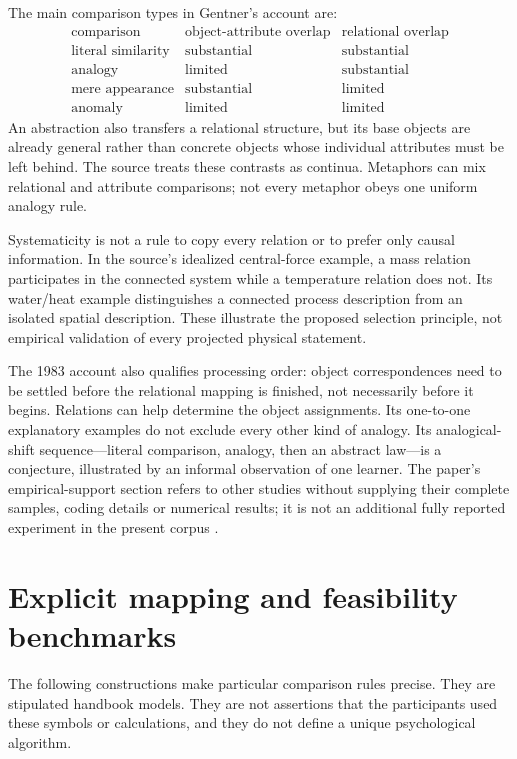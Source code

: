 The main comparison types in Gentner's account are:
\[
\begin{array}{l|cc}
 \text{comparison}&\text{object-attribute overlap}&
                   \text{relational overlap}\\ \hline
 \text{literal similarity}&\text{substantial}&\text{substantial}\\
 \text{analogy}&\text{limited}&\text{substantial}\\
 \text{mere appearance}&\text{substantial}&\text{limited}\\
 \text{anomaly}&\text{limited}&\text{limited}
\end{array}
\]
An abstraction also transfers a relational structure,
but its base objects are already general rather
than concrete objects whose individual attributes
must be left behind. The source treats these
contrasts as continua. Metaphors can mix relational
and attribute comparisons; not every metaphor
obeys one uniform analogy rule.

Systematicity is not a rule to copy every relation
or to prefer only causal information. In the source's
idealized central-force example, a mass relation
participates in the connected system while a
temperature relation does not. Its water/heat
example distinguishes a connected process description
from an isolated spatial description. These illustrate
the proposed selection principle, not empirical
validation of every projected physical statement.

The 1983 account also qualifies processing order:
object correspondences need to be settled before
the relational mapping is finished, not necessarily
before it begins. Relations can help determine
the object assignments. Its one-to-one explanatory
examples do not exclude every other kind of analogy.
Its analogical-shift sequence---literal comparison,
analogy, then an abstract law---is a conjecture,
illustrated by an informal observation of one
learner. The paper's empirical-support section
refers to other studies without supplying their
complete samples, coding details or numerical
results; it is not an additional fully reported
experiment in the present corpus
\cite[pp.~158, 164--170]{Gentner1983StructureMapping}.

\section{Explicit mapping and feasibility benchmarks}
\label{sec:p19-analogy-benchmarks}

The following constructions make particular comparison
rules precise. They are stipulated handbook models.
They are not assertions that the participants used
these symbols or calculations, and they do not define
a unique psychological algorithm.

